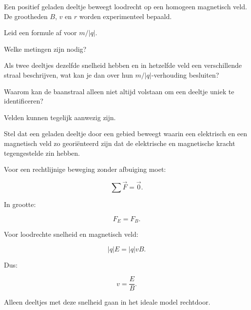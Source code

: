 \documentclass{ximera}
\begin{document}
\begin{oefening}{\oefG}

Een positief geladen deeltje beweegt loodrecht op een homogeen
magnetisch veld. De grootheden $B$, $v$ en $r$ worden experimenteel
bepaald.

\begin{question}
Leid een formule af voor $m/|q|$.
\end{question}

\begin{question}
Welke metingen zijn nodig?
\end{question}

\begin{question}
Als twee deeltjes dezelfde snelheid hebben en in hetzelfde veld een
verschillende straal beschrijven, wat kan je dan over hun
$m/|q|$-verhouding besluiten?
\end{question}

\begin{question}
Waarom kan de baanstraal alleen niet altijd volstaan om een deeltje
uniek te identificeren?
\end{question}

\end{oefening}




Velden kunnen tegelijk aanwezig zijn.

Stel dat een geladen deeltje door een gebied beweegt waarin een
elektrisch en een magnetisch veld zo georiënteerd zijn dat de
elektrische en magnetische kracht tegengestelde zin hebben.

Voor een rechtlijnige beweging zonder afbuiging moet:

\[
\sum\vec F=\vec0.
\]

In grootte:

\[
F_E=F_B.
\]

Voor loodrechte snelheid en magnetisch veld:

\[
|q|E=|q|vB.
\]

Dus:

\[
\boxed{
v=\frac EB.
}
\]

Alleen deeltjes met deze snelheid gaan in het ideale model rechtdoor.
\end{document}
